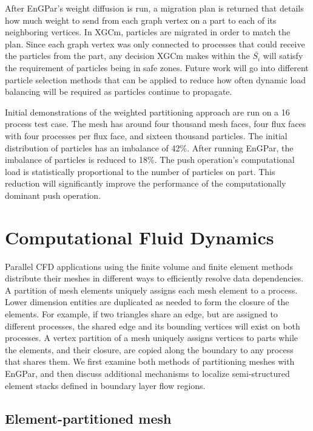 \documentclass[conference]{IEEEtran}
\begin{document}
After EnGPar's weight diffusion is run, a migration plan is returned that details how
much weight to send from each graph vertex on a part to each of its neighboring vertices.
In XGCm, particles are migrated in order to match the plan. Since each graph vertex was only
connected to processes that could receive the particles from the part, any decision XGCm makes
within the $\bar{S_i}$ will satisfy the requirement of particles being in safe zones. Future work
will go into different particle selection methods that can be applied to reduce how often
dynamic load balancing will be required as particles continue to propagate.

Initial demonstrations of the weighted partitioning approach are run on a 16
process test case. The mesh has around four thousand
mesh faces, four flux faces with four processes per flux face, and sixteen thousand particles.
The initial distribution of particles has an imbalance of 42\%. After running EnGPar, the
imbalance of particles is reduced to 18\%. The push operation's computational load is
statistically proportional to the number of particles on part. This
reduction will significantly improve the performance of the computationally
dominant push operation.

\section{Computational Fluid Dynamics} \label{sec:cfd}

Parallel CFD applications using the
finite volume and finite element methods distribute their meshes in different
ways to efficiently resolve data dependencies.
A partition of mesh elements uniquely assigns each mesh element to a process.
Lower dimension entities are duplicated as needed to form the closure of the
elements.
For example, if two triangles share an edge, but are assigned to different
processes, the shared edge and its bounding vertices will exist on both
processes.
A vertex partition of a mesh uniquely assigns vertices to parts while the
elements, and their closure, are copied along the boundary to any process that
shares them.
We first examine both methods of partitioning meshes with EnGPar, and then
discuss additional mechanisms to localize semi-structured element stacks
defined in boundary layer flow regions.

\subsection{Element-partitioned mesh}\label{sec:elmPtn}
\end{document}
